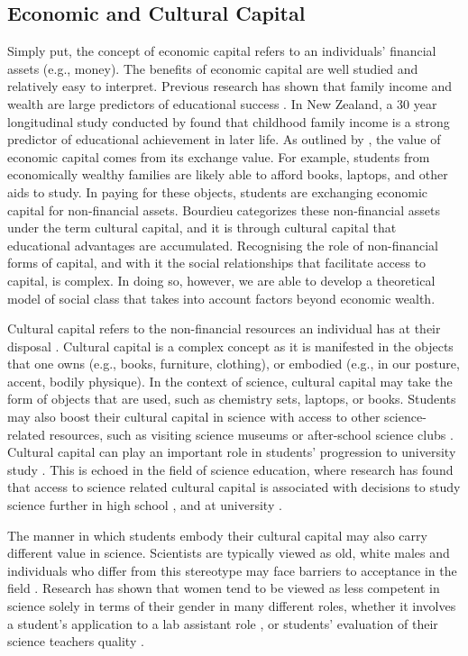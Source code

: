 \subsection{Economic and Cultural Capital}
Simply put, the concept of economic capital refers to an individuals' financial assets (e.g., money). The benefits of economic capital are well studied and relatively easy to interpret. Previous research has shown that family income and wealth are large predictors of educational success \citep{shapiro2013roots, blanden2004family}. In New Zealand, a 30 year longitudinal study conducted by \citet{gibb2012childhood} found that childhood family income is a strong predictor of educational achievement in later life. As outlined by \cite{Bourdieu_1986}, the value of economic capital comes from its exchange value. For example, students from economically wealthy families are likely able to afford books, laptops, and other aids to study. In paying for these objects, students are exchanging economic capital for non-financial assets. Bourdieu categorizes these non-financial assets under the term cultural capital, and it is through cultural capital that educational advantages are accumulated. Recognising the role of non-financial forms of capital, and with it the social relationships that facilitate access to capital, is complex. In doing so, however, we are able to develop a theoretical model of social class that takes into account factors beyond economic wealth. 

Cultural capital refers to the non-financial resources an individual has at their disposal \citep{Bourdieu_1986}. Cultural capital is a complex concept as it is manifested in the objects that one owns (e.g., books, furniture, clothing), or embodied (e.g., in our posture, accent, bodily physique). In the context of science, cultural capital may take the form of objects that are used, such as chemistry sets, laptops, or books. Students may also boost their cultural capital in science with access to other science-related resources, such as visiting science museums \citep{Dawson2014} or after-school science clubs \citep{mujtaba2018students}. Cultural capital can play an important role in students' progression to university study \citep{aschaffenburg1997cultural}. This is echoed in the field of science education, where research has found that access to science related cultural capital is associated with decisions to study science further in high school \citep{mujtaba2018students}, and at university \citep{Lyons_2006}.

The manner in which students embody their cultural capital may also carry different value in science. Scientists are typically viewed as old, white males \citep{Nosek_2009,Barthelemy_2016} and individuals who differ from this stereotype may face barriers to acceptance in the field \citep{ong2005body}. Research has shown that women tend to be viewed as less competent in science solely in terms of their gender in many different roles, whether it involves a student's application to a lab assistant role \citep{Moss_2012}, or students' evaluation of their science teachers quality \citep{Potvin_2016}. 

